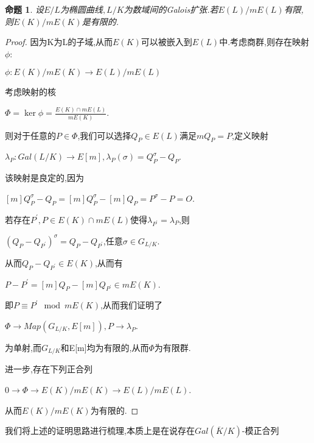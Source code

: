 \documentclass[11pt]{ctexart}
\newtheorem{pro}{命题}[section]
\begin{document}
\begin{pro}设$E/L$为椭圆曲线$,L/K$为数域间的Galois扩张.若$E(L)/mE(L)$有限,则$E(K)/mE(K)$是有限的.
\end{pro}
\begin{proof}因为K为L的子域,从而$E(K)$可以被嵌入到$E(L)$中.考虑商群,则存在映射$\phi$:
\begin{center}
    $\phi :E(K)/mE(K) \longrightarrow E(L)/mE(L)  $
\end{center}
考虑映射的核
\begin{center}
    $\Phi=\ker\phi=\frac{E(K)\cap mE(L) }{mE(K)}$.
\end{center}
则对于任意的$P \in \Phi$,我们可以选择$Q_P \in E(L)$满足$mQ_P=P$,定义映射
\begin{center}
    $\lambda_P:Gal(L/K)\rightarrow E[m],\lambda_P(\sigma)=Q_P^{\sigma}-Q_P$.
\end{center}
该映射是良定的,因为
\begin{center}
    $[m]Q_P^{\sigma}-Q_P=[m]Q_P^{\sigma}-[m]Q_P=P^{\sigma}-P=O$.
\end{center}
若存在$P^{\prime},P \in E(K) \cap mE(L)$使得$\lambda_{P^{\prime}}=\lambda_P$,则
\begin{center}
    $(Q_P-Q_{P^{\prime}})^{\sigma}=Q_P-Q_{P^{\prime}}$,任意$\sigma \in G_{L/K}$.
\end{center}
从而$Q_P-Q_{P^{\prime}} \in E(K)$,从而有
\begin{center}
    $P-P^{\prime}=[m]Q_P-[m]Q_{P^{\prime}}\in mE(K)$.
\end{center}
即$P\equiv P^{\prime}\mod mE(K)$,从而我们证明了
\begin{center}
    $\Phi \rightarrow Map(G_{L/K},E[m]),P \rightarrow \lambda_P$.
\end{center}
为单射,而$G_{L/K}$和E[m]均为有限的,从而$\Phi$为有限群.

进一步,存在下列正合列
\begin{center}
    $0\rightarrow\Phi \rightarrow E(K)/mE(K) \rightarrow E(L)/mE(L)$.
\end{center}
从而$E(K)/mE(K)$为有限的.
\end{proof}
我们将上述的证明思路进行梳理,本质上是在说存在$Gal(\overline{K}/K)$-模正合列
\end{document}
